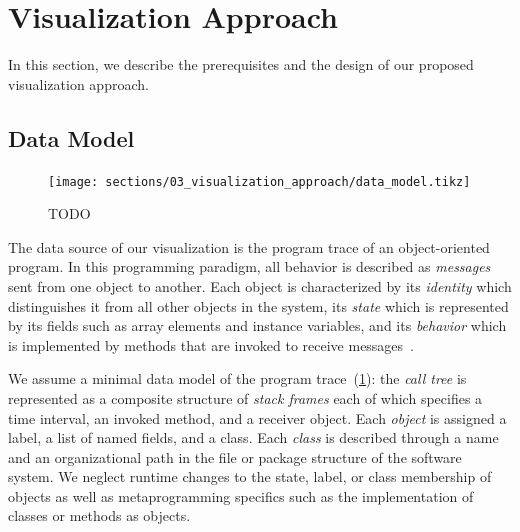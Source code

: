 \section{Visualization Approach}
\label{sec:visualization_approach}

In this section, we describe the prerequisites and the design of our proposed visualization approach.

\subsection{Data Model}
\label{sec:visualization_approach/data_model}

\begin{figure}
	\texttt{[image: sections/03\_visualization\_approach/data\_model.tikz]}
	\caption{TODO}
	\label{fig:visualization_approach/data_model}
\end{figure}

The data source of our visualization is the program trace of an object-oriented program.
In this programming paradigm, all behavior is described as \emph{messages} sent from one object to another.
Each object is characterized by its \emph{identity} which distinguishes it from all other objects in the system, its \emph{state} which is represented by its fields such as array elements and instance variables, and its \emph{behavior} which is implemented by methods that are invoked to receive messages~\cite{thiede2023time}.

We assume a minimal data model of the program trace~(\cref{fig:visualization_approach/data_model}):
the \emph{call tree} is represented as a composite structure of \emph{stack frames} each of which specifies a time interval, an invoked method, and a receiver object.
Each \emph{object} is assigned a label, a list of named fields, and a class.
Each \emph{class} is described through a name and an organizational path in the file or package structure of the software system.
We neglect runtime changes to the state, label, or class membership of objects as well as metaprogramming specifics such as the implementation of classes or methods as objects.

